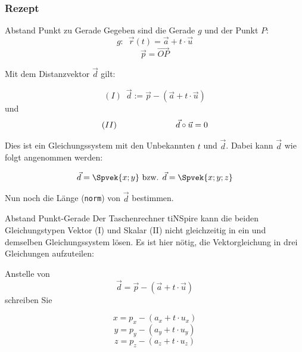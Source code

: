 \newpage

\subsubsection*{Rezept}

\begin{rezept}{Abstand Punkt zu Gerade}{}
  Gegeben sind die Gerade $g$ und der Punkt $P$:
  $$g: \,\,\, \vec{r}(t) = \vec{a} + t\cdot{} \vec{u}$$
  $$\vec{p} = \overrightarrow{OP}$$

  Mit dem Distanzvektor $\vec{d}$ gilt:

  $$(I) \,\,\, \vec{d} := \vec{p} - (\vec{a} + t\cdot{}\vec{u})$$
  und
  $$(II) \hspace{25mm}  \vec{d} \circ \vec{u} = 0$$

  Dies ist ein Gleichungssystem mit den Unbekannten $t$ und
  $\vec{d}$. Dabei kann $\vec{d}$ wie folgt angenommen werden:

  $$\vec{d} = \Spvek{x;y} \text{ bzw. } \vec{d} = \Spvek{x;y;z}$$

  Nun noch die Länge (\texttt{norm}) von $\vec{d}$ bestimmen.
\end{rezept}

\begin{bemerkung}{Abstand Punkt-Gerade}{}
  Der Taschenrechner tiNSpire kann die beiden Gleichungstypen Vektor (I)
  und Skalar (II) nicht gleichzeitig in ein und demselben Gleichungssystem
  lösen. Es ist hier nötig, die Vektorgleichung in drei Gleichungen
  aufzuteilen:

  Anstelle von 
  $$\vec{d} = \vec{p} - (\vec{a} + t\cdot{}\vec{u})$$
  schreiben Sie
  
  $$x = p_x - (a_x + t\cdot{}u_x)$$
  $$y = p_y - (a_y + t\cdot{}u_y)$$
  $$z = p_z - (a_z + t\cdot{}u_z)$$
    
\end{bemerkung}

